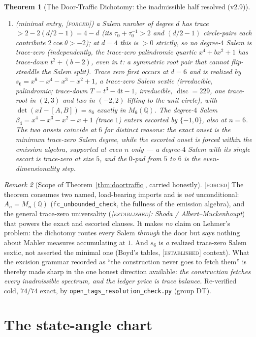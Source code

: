 \documentclass[11pt]{article}
\newcommand{\tagF}{\textcolor{cF}{\textsc{[forced]}}}
\newcommand{\tagE}{\textcolor{cE}{\textsc{[established]}}}
\newcommand{\hx}[1]{\textcolor{cC}{\footnotesize\texttt{#1}}}
\newcommand{\Q}{\mathbb{Q}}
\theoremstyle{plain}
\newtheorem{theorem}{Theorem}[section]
\theoremstyle{definition}
\theoremstyle{remark}
\newtheorem{remark}[theorem]{Remark}
\begin{document}
\begin{theorem}[The Door-Traffic Dichotomy: the inadmissible half resolved (v2.9)]
\begin{enumerate}[nosep,label=(\alph*),leftmargin=2.2em]
(\hx{DT-F1}).
\item\emph{(minimal entry, \tagF{})} a Salem number of degree $d$ has trace
$>2-2(d/2-1)=4-d$ (its $\tau_0+\tau_0^{-1}>2$ and $(d/2-1)$ circle-pairs each
contribute $2\cos\theta>-2$); at $d=4$ this is $>0$ strictly, so \emph{no degree-$4$
Salem is trace-zero} (independently, the trace-zero palindromic quartic
$x^4+bx^2+1$ has trace-down $t^2+(b-2)$, even in $t$: a symmetric root pair that
cannot flip-straddle the Salem split). Trace zero first occurs at $d=6$ and is
realized by $s_6=x^6-x^4-x^3-x^2+1$, a trace-zero Salem sextic (irreducible,
palindromic; trace-down $T=t^3-4t-1$, irreducible, $\operatorname{disc}=229$, one
trace-root in $(2,3)$ and two in $(-2,2)$ lifting to the unit circle), with
$\det(xI-[A,B])=s_6$ exactly in $M_6(\Q)$. The degree-$4$ Salem
$\beta_4=x^4-x^3-x^2-x+1$ (trace $1$) enters \emph{escorted} by $\{-1,0\}$, also at
$n=6$. The two onsets coincide at $6$ for distinct reasons: the exact onset is the
minimum trace-zero Salem degree, while the escorted onset is forced \emph{within}
the emission algebra, supported at even $n$ only --- a degree-$4$ Salem with its
single escort is trace-zero at size $5$, and the $0$-pad from $5$ to $6$ is the
even-dimensionality step.
\end{enumerate}
\end{theorem}

\begin{remark}[Scope of Theorem~\ref{thm:doortraffic}, carried honestly]\label{rem:doortraffic}\tagF{}
The theorem consumes two named, load-bearing imports and is \emph{not}
unconditional: $A_n=M_n(\Q)$ (\texttt{fc\_unbounded\_check}, the fullness of the
emission algebra), and the general trace-zero universality (\emph{\tagE{}: Shoda /
Albert--Muckenhoupt}) that powers the exact and escorted clauses. It makes \emph{no}
claim on Lehmer's problem: the dichotomy routes every Salem \emph{through} the door
but says nothing about Mahler measures accumulating at $1$. And $s_6$ is \emph{a}
realized trace-zero Salem sextic, not asserted the minimal one (Boyd's tables,
\tagE{} context). What the excision grammar recorded as ``the construction never
goes to fetch them'' is thereby made sharp in the one honest direction available:
\emph{the construction fetches every inadmissible spectrum, and the ledger price is
trace balance.} Re-verified cold, $74/74$ exact, by
\texttt{open\_tags\_resolution\_check.py} (group DT).
\end{remark}

\section{The state-angle chart}\label{sec:stateangle}
\end{document}
